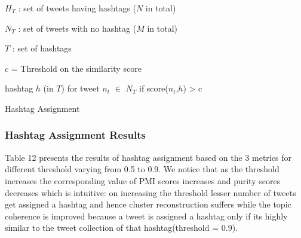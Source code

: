 \documentclass[10pt,a5paper,twoside]{article}
\newcommand{\var}{v}
\begin{document}
\incmargin{1.5em}
\linesnumbered
\begin{algorithm}[hb!]
\dontprintsemicolon

\Input
{
$H_T$ : set of tweets having hashtags ($N$ in total)
 
$N_T$ : set of tweets with no hashtag ($M$ in total)
 
$T$ : set of hashtags
 
$c$ = \footnotesize{Threshold} on the similarity score
}
\Output
{
hashtag $h$ (in $T$) for tweet $n_t$ $\in$ $N_T$ if score($n_t$,$h$) > c
}
\BlankLine
{\small
{}
}
\caption{{\sc Hashtag Assignment} \label{alg:tagassign}}
\end{algorithm}
\decmargin{1.5em}


\subsubsection{Hashtag Assignment Results}
Table 12 presents the results of hashtag assignment based on the 3 metrics for different threshold varying from 0.5 to 0.9. We notice that as the threshold increases the corresponding value of PMI scores increases and purity scores decreases which is intuitive: on increasing the threshold lesser number of tweets get assigned a hashtag and hence cluster reconstruction suffers while the topic coherence is improved because a tweet is assigned a hashtag only if its highly similar to the tweet collection of that hashtag(threshold = 0.9). 
\\
\end{document}
